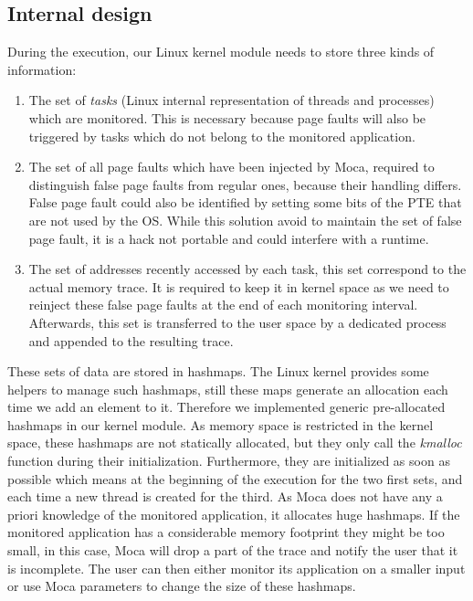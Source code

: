 \subsection{Internal design}

During the execution, our \gls{Linux} kernel module needs to store three kinds of information:

\begin{enumerate}
    \item The set of \emph{tasks} (Linux internal representation of threads and processes) which are
monitored.
    This is necessary because page faults will also be triggered by tasks which do not belong to the monitored application.
    \item The set of all page faults which have been injected by \gls{Moca}, required to distinguish false page faults from regular ones, because their handling differs.
        False page fault could also be identified by setting some bits of the \gls{PTE} that are not used by the \gls{OS}.
        While this solution avoid to maintain the set of false page fault, it is a hack not portable and could interfere with a runtime.
    \item The set of addresses recently accessed by each task, this set correspond to the actual memory trace.
        It is required to keep it in kernel space as we need to reinject these false page faults at the end of each monitoring interval.
        Afterwards, this set is transferred to the user space by a dedicated process and appended to the resulting trace.
\end{enumerate}

These sets of data are stored in hashmaps.
The \gls{Linux} kernel provides some helpers to manage such hashmaps, still these maps generate an allocation each time we add an element to it.
Therefore we implemented generic pre-allocated hashmaps in our kernel module.
As memory space is restricted in the kernel space, these hashmaps are not statically allocated, but they only call the \emph{kmalloc} function during their initialization.
Furthermore, they are initialized as soon as possible which means at the beginning of the execution for the two first sets, and each time a new thread is created for the third.
As \gls{Moca} does not have any a priori knowledge of the monitored application, it allocates huge hashmaps.
If the monitored application has a considerable memory footprint they might be too small, in this case, \gls{Moca} will drop a part of the trace and notify the user that it is incomplete.
The user can then either monitor its application on a smaller input or  use \gls{Moca} parameters to change the size of these hashmaps.

